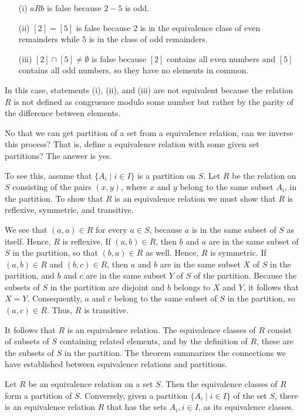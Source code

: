 \begin{solution}
	\begin{enumerate}
		\item[(i)] \( aRb \) is false because \( 2 - 5 \) is odd.
		\item[(ii)] \( [2] = [5] \) is false because \( 2 \) is in the equivalence class of even remainders while \( 5 \) is in the class of odd remainders.
		\item[(iii)] \( [2] \cap [5] \neq \emptyset \) is false because \( [2] \) contains all even numbers and \( [5] \) contains all odd numbers, so they have no elements in common.
	\end{enumerate}
	In this case, statements (i), (ii), and (iii) are not equivalent because the relation \( R \) is not defined as congruence modulo some number but rather by the parity of the difference between elements.
\end{solution}

No that we can get partition of a set from a equivalence relation, can we inverse this process? That is, define a equivalence relation with some given set partitions? The answer is yes. 

To see this, assume that \( \{A_i \mid i \in I\} \) is a partition on \( S \). Let \( R \) be the relation on \( S \) consisting of the pairs \( (x, y) \), where \( x \) and \( y \) belong to the same subset \( A_i \), in the partition. To show that \( R \) is an equivalence relation we must show that \( R \) is reflexive, symmetric, and transitive.

We see that \( (a, a) \in R \) for every \( a \in S \), because \( a \) is in the same subset of \( S \) as itself. Hence, \( R \) is reflexive. If \( (a, b) \in R \), then \( b \) and \( a \) are in the same subset of \( S \) in the partition, so that \( (b, a) \in R \) as well. Hence, \( R \) is symmetric. If \( (a, b) \in R \) and \( (b, c) \in R \), then \( a \) and \( b \) are in the same subset \( X \) of \( S \) in the partition, and \( b \) and \( c \) are in the same subset \( Y \) of \( S \) of the partition. Because the subsets of \( S \) in the partition are disjoint and \( b \) belongs to \( X \) and \( Y \), it follows that \( X = Y \). Consequently, \( a \) and \( c \) belong to the same subset of \( S \) in the partition, so \( (a, c) \in R \). Thus, \( R \) is transitive.

It follows that \( R \) is an equivalence relation. The equivalence classes of \( R \) consist of subsets of \( S \) containing related elements, and by the definition of \( R \), these are the subsets of \( S \) in the partition. The theorem summarizes the connections we have established between equivalence relations and partitions.
\begin{theorem}
	Let \( R \) be an equivalence relation on a set \( S \). Then the equivalence classes of \( R \) form a partition of \( S \). Conversely, given a partition \( \{A_i \mid i \in I\} \) of the set \( S \), there is an equivalence relation \( R \) that has the sets \( A_i, i \in I \), as its equivalence classes.
\end{theorem}

